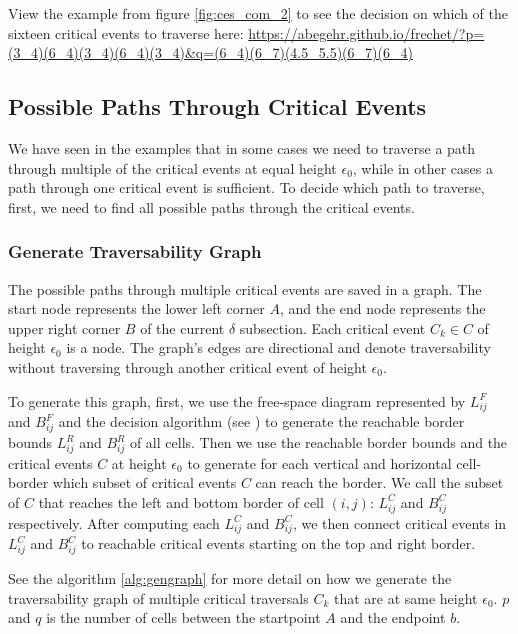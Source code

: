 View the example from figure \ref{fig:ces_com_2} to see the decision on which of the sixteen critical events to traverse here: \url{https://abegehr.github.io/frechet/?p=(3_4)(6_4)(3_4)(6_4)(3_4)&q=(6_4)(6_7)(4.5_5.5)(6_7)(6_4)}


\subsection{Possible Paths Through Critical Events} \label{sec:gengraph}

We have seen in the examples that in some cases we need to traverse a path through multiple of the critical events at equal height $\epsilon_0$, while in other cases a path through one critical event is sufficient. To decide which path to traverse, first, we need to find all possible paths through the critical events.

\subsubsection{Generate Traversability Graph}

The possible paths through multiple critical events are saved in a graph. The start node represents the lower left corner $A$, and the end node represents the upper right corner $B$ of the current $\delta$ subsection. Each critical event $C_k \in C$ of height $\epsilon_0$ is a node. The graph's edges are directional and denote traversability without traversing through another critical event of height $\epsilon_0$.

To generate this graph, first, we use the free-space diagram represented by $L_{ij}^F$ and $B_{ij}^F$ and the decision algorithm (see \citet{altgodau}) to generate the reachable border bounds $L_{ij}^R$ and $B_{ij}^R$ of all cells. Then we use the reachable border bounds and the critical events $C$ at height $\epsilon_0$ to generate for each vertical and horizontal cell-border which subset of critical events $C$ can reach the border. We call the subset of $C$ that reaches the left and bottom border of cell $(i,j)$: $L_{ij}^C$ and $B_{ij}^C$ respectively. After computing each $L_{ij}^C$ and $B_{ij}^C$, we then connect critical events in $L_{ij}^C$ and $B_{ij}^C$ to reachable critical events starting on the top and right border.

See the algorithm \ref{alg:gengraph} for more detail on how we generate the traversability graph of multiple critical traversals $C_k$ that are at same height $\epsilon_0$. $p$ and $q$ is the number of cells between the startpoint $A$ and the endpoint $b$.


